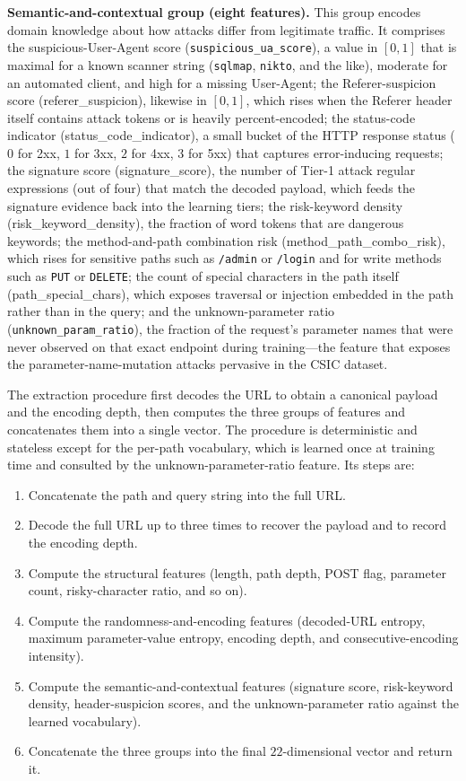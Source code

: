 \documentclass[../main.tex]{subfiles}
\begin{document}
\textbf{Semantic-and-contextual group (eight features).} This group
encodes domain knowledge about how attacks differ from legitimate traffic. It
comprises the suspicious-User-Agent score (\texttt{suspicious\_ua\_score}), a
value in $[0,1]$ that is maximal for a known scanner string (\texttt{sqlmap},
\texttt{nikto}, and the like), moderate for an automated client, and high for
a missing User-Agent; the Referer-suspicion score
(referer\_suspicion), likewise in $[0,1]$, which rises when the
Referer header itself contains attack tokens or is heavily percent-encoded;
the status-code indicator (status\_code\_indicator), a small bucket
of the HTTP response status ($0$ for 2xx, $1$ for 3xx, $2$ for 4xx, $3$ for
5xx) that captures error-inducing requests; the signature score
(signature\_score), the number of Tier-1 attack regular expressions
(out of four) that match the decoded payload, which feeds the signature
evidence back into the learning tiers; the risk-keyword density
(risk\_keyword\_density), the fraction of word tokens that are
dangerous keywords; the method-and-path combination risk
(method\_path\_combo\_risk), which rises for sensitive paths such as
\texttt{/admin} or \texttt{/login} and for write methods such as \texttt{PUT}
or \texttt{DELETE}; the count of special characters in the path itself
(path\_special\_chars), which exposes traversal or injection embedded
in the path rather than in the query; and the unknown-parameter ratio
(\texttt{unknown\_param\_ratio}), the fraction of the request's parameter
names that were never observed on that exact endpoint during training---the
feature that exposes the parameter-name-mutation attacks pervasive in the
CSIC dataset.

The extraction procedure first decodes the URL to obtain a canonical payload
and the encoding depth, then computes the three groups of features and
concatenates them into a single vector. The procedure is deterministic and
stateless except for the per-path vocabulary, which is learned once at
training time and consulted by the unknown-parameter-ratio feature. Its
steps are:

\begin{enumerate}[leftmargin=1.8em, itemsep=2pt]
  \item Concatenate the path and query string into the full URL.
  \item Decode the full URL up to three times to recover the payload and to
        record the encoding depth.
  \item Compute the structural features (length, path depth, POST flag,
        parameter count, risky-character ratio, and so on).
  \item Compute the randomness-and-encoding features (decoded-URL entropy,
        maximum parameter-value entropy, encoding depth, and
        consecutive-encoding intensity).
  \item Compute the semantic-and-contextual features (signature score,
        risk-keyword density, header-suspicion scores, and the
        unknown-parameter ratio against the learned vocabulary).
  \item Concatenate the three groups into the final $22$-dimensional vector
        and return it.
\end{enumerate}
\end{document}
